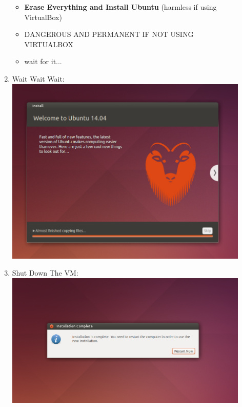 \documentclass[12pt]{article}
\begin{document}
\begin{description}
\begin{enumerate}
\begin{itemize}
                 \item {\bf Erase Everything and Install Ubuntu} (harmless if using VirtualBox)
                 \item DANGEROUS AND PERMANENT IF NOT USING VIRTUALBOX
                 \item wait for it...    
            \end{itemize}
	\newpage
\item Wait Wait Wait: \vspace{20mm} \\
      		\hspace*{-2.5cm}\includegraphics[scale=.6]{Capture13.png}
	\newpage
\item Shut Down The VM: \vspace{20mm} \\
      		\includegraphics[scale=.6]{Capture14.png}\\
			

\end{enumerate}
\end{description}
\end{document}

